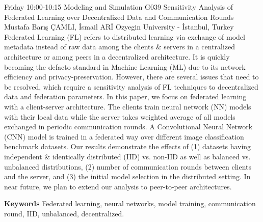 
    \begin{abstract_basarim}
    {Friday 10:00-10:15}
    {Modeling and Simulation}
    {G039}
    {Sensitivity Analysis of Federated Learning over Decentralized Data and Communication Rounds}
    {%
    Mustafa Barış ÇAMLI, İsmail ARİ}
    {%
    }
    {%
    Ozyegin University - İstanbul, Turkey}
    Federated Learning (FL) refers to distributed learning via exchange of model metadata instead of raw data among the clients & servers in a centralized architecture or among peers in a decentralized architecture. It is quickly becoming the defacto standard in Machine Learning (ML) due to its network efficiency and privacy-preservation. However, there are several issues that need to be resolved, which require a sensitivity analysis of FL techniques to decentralized data and federation parameters. In this paper, we focus on federated learning with a client-server architecture. The clients train neural network (NN) models with their local data while the server takes weighted average of all models exchanged in periodic communication rounds. A Convolutional Neural Network (CNN) model is trained in a federated way over different image classification benchmark datasets. Our results demonstrate the effects of (1) datasets having independent & identically distributed (IID) vs. non-IID as well as balanced vs. unbalanced distributions, (2) number of communication rounds between clients and the server, and (3) the initial model selection in the distributed setting. In near future, we plan to extend our analysis to peer-to-peer architectures. 
    
        \textbf{Keywords} \newline{}Federated learning, neural networks, model training, communication round, IID, unbalanced, decentralized.
    \end{abstract_basarim}
    